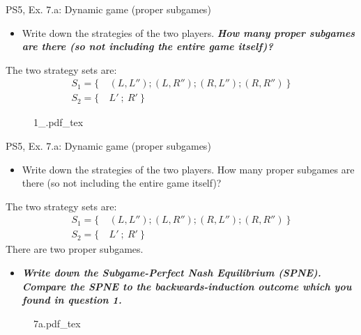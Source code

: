 \begin{frame}{PS5, Ex. 7.a: Dynamic game (proper subgames)}
  \begin{multicols}{2}
    \begin{itemize}
      \item[(a)] Write down the strategies of the two players. \textbf{\textit{How many proper subgames are there (so not including the entire game itself)?}}
    \end{itemize}
    The two strategy sets are:
    \begin{align*}
      S_1=\{\ &(L, L''); (L, R''); (R, L''); (R, R'')\ \}\\
      S_2=\{\ &L'\ ;\ R'\ \}
    \end{align*}
    \vfill\null \columnbreak
    \begin{figure}[!h]
      \center
      \def\svgwidth{.8\columnwidth}
      {1_.pdf_tex}
    \end{figure}
    \vfill\null
  \end{multicols}
\end{frame}
\begin{frame}{PS5, Ex. 7.a: Dynamic game (proper subgames)}
  \begin{multicols}{2}
    \begin{itemize}
      \item[(a)] Write down the strategies of the two players. How many proper subgames are there (so not including the entire game itself)?
    \end{itemize}
    The two strategy sets are:
    \begin{align*}
      S_1=\{\ &(L, L''); (L, R''); (R, L''); (R, R'')\ \}\\
      S_2=\{\ &L'\ ;\ R'\ \}
    \end{align*}
    There are two proper subgames.
    \begin{itemize}
      \item[(b)] \textbf{\textit{Write down the Subgame-Perfect Nash Equilibrium (SPNE). Compare the SPNE to the backwards-induction outcome which you found in question 1.}}
    \end{itemize}
    \vfill\null \columnbreak
    \begin{figure}[!h]
      \center
      \def\svgwidth{\columnwidth}
      {7a.pdf_tex}
    \end{figure}
    \vfill\null
  \end{multicols}
\end{frame}

